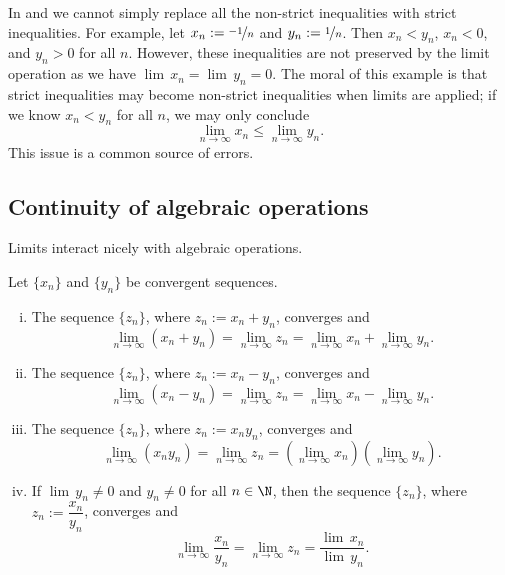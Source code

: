 \documentclass[12pt]{book}
\begin{document}
In  and  we cannot simply replace
all the non-strict inequalities with
strict inequalities.
For example,
let $x_n := \nicefrac{-1}{n}$ and $y_n := \nicefrac{1}{n}$.
Then $x_n < y_n$, $x_n < 0$,
and $y_n > 0$ for all $n$.
However, these inequalities are
not preserved by the limit operation as we have
$\lim\, x_n = \lim\, y_n = 0$.
The moral of this example is that strict inequalities may become non-strict
inequalities when limits are applied; if we know
$x_n < y_n$ for all $n$,
we may only conclude 
\begin{equation*}
\lim_{n \to \infty} x_n \leq
\lim_{n \to \infty} y_n .
\end{equation*}
This issue is a common source of errors.

\subsection*{Continuity of algebraic operations}

Limits interact nicely with algebraic operations.

\begin{prop} \label{prop:contalg}
Let $\{ x_n \}$ and $\{ y_n \}$ be convergent sequences.
\begin{enumerate}[(i)]
\item \label{prop:contalg:i}
The sequence $\{ z_n \}$, where $z_n := x_n + y_n$, converges and
\begin{equation*}
\lim_{n \to \infty} (x_n + y_n) = 
\lim_{n \to \infty} z_n = 
\lim_{n \to \infty} x_n + 
\lim_{n \to \infty} y_n .
\end{equation*}
\item \label{prop:contalg:ii}
The sequence $\{ z_n \}$, where $z_n := x_n - y_n$, converges and
\begin{equation*}
\lim_{n \to \infty} (x_n - y_n) = 
\lim_{n \to \infty} z_n = 
\lim_{n \to \infty} x_n - 
\lim_{n \to \infty} y_n .
\end{equation*}
\item \label{prop:contalg:iii}
The sequence $\{ z_n \}$, where $z_n := x_n y_n$, converges and
\begin{equation*}
\lim_{n \to \infty} (x_n y_n) = 
\lim_{n \to \infty} z_n = 
\left( \lim_{n \to \infty} x_n \right)
\left( \lim_{n \to \infty} y_n \right) .
\end{equation*}
\item \label{prop:contalg:iv}
If $\lim\, y_n \not= 0$ and $y_n \not= 0$ for all $n \in \N$, then
the sequence $\{ z_n \}$, where $z_n := \dfrac{x_n}{y_n}$, converges and
\begin{equation*}
\lim_{n \to \infty} \frac{x_n}{y_n} = 
\lim_{n \to \infty} z_n = 
\frac{\lim\, x_n}{\lim\, y_n} .
\end{equation*}
\end{enumerate}
\end{prop}
\end{document}
